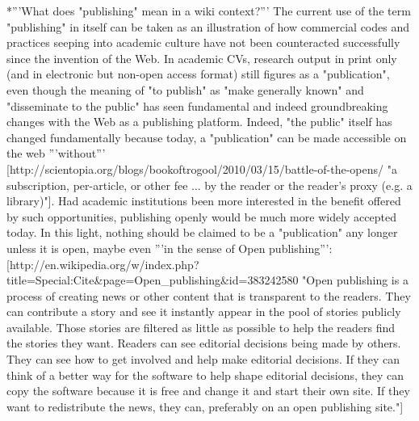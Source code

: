 *'''What does "publishing" mean in a wiki context?''' The current use of the term "publishing" in itself can be taken as an illustration of how commercial codes and practices seeping into academic culture have not been counteracted successfully since the invention of the Web. In academic CVs, research output in print only (and in electronic but non-open access format) still figures as a "publication", even though the meaning of "to publish" as "make generally known" and "disseminate to the public" has seen fundamental and indeed groundbreaking changes with the Web as a publishing platform. Indeed, "the public" itself has changed fundamentally because today, a "publication" can be made accessible on the web '''without''' [http://scientopia.org/blogs/bookoftrogool/2010/03/15/battle-of-the-opens/ "a subscription, per-article, or other fee ... by the reader or the reader's proxy (e.g. a library)"]. Had academic institutions been more interested in the benefit offered by such opportunities, publishing openly would be much more widely accepted today. In this light, nothing should be claimed to be a "publication" any longer unless it is open, maybe even '''in the sense of Open publishing''': [http://en.wikipedia.org/w/index.php?title=Special:Cite&page=Open_publishing&id=383242580 "Open publishing is a process of creating news or other content that is transparent to the readers. They can contribute a story and see it instantly appear in the pool of stories publicly available. Those stories are filtered as little as possible to help the readers find the stories they want. Readers can see editorial decisions being made by others. They can see how to get involved and help make editorial decisions. If they can think of a better way for the software to help shape editorial decisions, they can copy the software because it is free and change it and start their own site. If they want to redistribute the news, they can, preferably on an open publishing site."]

